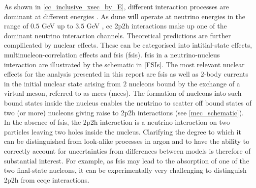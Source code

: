 As shown in \cref{cc_inclusive_xsec_by_E}, different interaction processes are dominant at different energies \cite{bathe-peters:2020}. As \acrshort{dune} will operate at neutrino energies in the range of $0.5$ GeV up to $3.5$ GeV \cite{DUNE:2020ypp}, \acrshort{cc} \acrshort{2p2h} interactions make up one of the dominant neutrino interaction channels. %
Theoretical predictions are further complilcated by nuclear effects. These can be categorised into intitial-state effects, multinucleon-correlation effects and \acrlong{fsi}s (\acrshort{fsi}s). %
\acrshort{fsi}s in a neutrino-nucleus interaction are illustrated by the schematic in \cref{FSIs}.
%
The most relevant nuclear effects for the analysis presented in this report are \acrshort{fsi}s as well as $2$-body currents in the initial nuclear state arising from $2$ nucleons bound by the exchange of a virtual meson, referred to as \acrlong{mec}s (\acrshort{mec}s). The formation of nucleons into such bound states inside the nucleus enables the neutrino to scatter off bound states of two (or more) nucleons giving raise to \acrshort{2p2h} interactions (see \cref{mec_schematic}). In the absence of \acrshort{fsi}s, the \acrshort{2p2h} interaction is a neutrino interaction on two particles leaving two holes inside the nucleus. 
Clarifying the degree to which it can be distinguished from look-alike processes \cite{PhysRevC.98.045502} in argon and to have the ability to correctly account for uncertainties from differences between models is therefore of substantial interest. For example, as \acrshort{fsi}s may lead to the absorption of one of the two final-state nucleons, it can be experimentally very challenging to distinguish \acrshort{2p2h} from \acrshort{cc}\acrshort{qe} interactions. %
